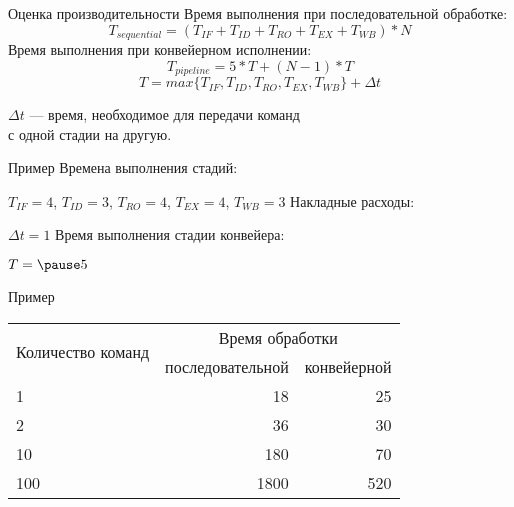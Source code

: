 \begin{frame}{Оценка производительности}
Время выполнения при последовательной обработке:
\begin{displaymath}
T_{sequential} = (T_{IF} + T_{ID} + T_{RO} + T_{EX} + T_{WB}) * N
\end{displaymath}
\vfill\pause
Время выполнения при конвейерном исполнении:
\begin{displaymath}
T_{pipeline} = 5 * T + (N - 1) * T
\end{displaymath}
\begin{displaymath}
T = max \{T_{IF}, T_{ID}, T_{RO}, T_{EX}, T_{WB}\} + \Delta t
\end{displaymath}
\begin{center}
$\Delta t$ --- время, необходимое для передачи команд\\с одной стадии на другую.
\end{center}
\end{frame}

\begin{frame}{Пример}
Времена выполнения стадий:

$T_{IF} = 4$, $T_{ID} = 3$, $T_{RO} = 4$, $T_{EX} = 4$, $T_{WB} = 3$
\vfill
Накладные расходы:

$\Delta t = 1$
\vfill
Время выполнения стадии конвейера:

$T = \pause5$
\end{frame}

\begin{frame}{Пример}
\begin{table}[htpb]
    \centering
    \begin{tabular}{|l|r|r|}
    \hline
    \multirow{2}{*}{Количество команд}   &   \multicolumn{2}{c|}{Время обработки} \\
    \cline{2-3}
                        &   последовательной    &   конвейерной \\
    \hline
    1                   &   18                  &   25          \\
    \hline
    2                   &   36                  &   30          \\
    \hline
    10                  &   180                 &   70          \\
    \hline
    100                 &   1800                &   520         \\
    \hline
    \end{tabular}
\end{table}
\end{frame}

